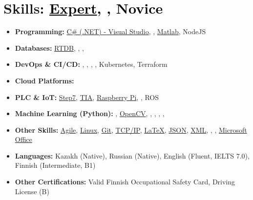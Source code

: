 \documentclass[a4paper,10pt]{article}
\begin{document}
\section*{Skills: \small\textcolor{black}{\uline{Expert}, , Novice}}
\begin{itemize}
    \item \textbf{Programming:} 
      \uline{C\# (.NET) - Visual Studio}, 
      , 
      \uline{Matlab},
      NodeJS
    \item \textbf{Databases:} 
      \uline{RTDB},
      , 
      ,
    \item \textbf{DevOps \& CI/CD:} 
      , 
      , 
      , 
      , 
      Kubernetes, 
      Terraform
    \item \textbf{Cloud Platforms:} 
    \item \textbf{PLC \& IoT:} 
      \uline{Step7}, 
      \uline{TIA}, 
      \uline{Raspberry Pi}, 
      ,
      ROS
    \item \textbf{Machine Learning (Python):} 
      , 
      \uline{OpenCV}, 
      , 
      , 
      , 
      , 
    \item \textbf{Other Skills:} 
      \uline{Agile}, 
      \uline{Linux}, 
      \uline{Git}, 
      \uline{TCP/IP}, 
      \uline{LaTeX}, 
      \uline{JSON}, 
      \uline{XML}, 
      ,
      ,
      \uline{Microsoft Office}
    \item \textbf{Languages:} Kazakh (Native), Russian (Native), English (Fluent, IELTS 7.0), Finnish (Intermediate, B1)
    \item \textbf{Other Certifications:} Valid Finnish Occupational Safety Card, Driving License (B)
\end{itemize}
\end{document}

